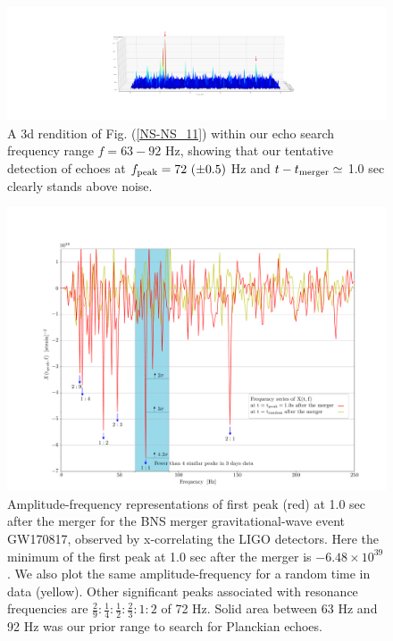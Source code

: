 \documentclass[a4paper,11pt]{article}
\begin{document}
\begin{figure}[!tbp]
    \includegraphics[width=\textwidth]{3d.pdf}
 \caption{A 3d rendition of Fig. (\ref{NS-NS_11}) within our echo search frequency range $f=63-92$ Hz, showing that our tentative detection of echoes at  $f_{\rm{peak}}=72\ (\pm 0.5)$ Hz and $t-t_{\rm{merger}} \simeq $ 1.0 sec clearly stands above noise. }
 \label{NS-NS_3d}
\end{figure}

\begin{figure}[!tbp]
    \includegraphics[width=1\textwidth]{peaks_in_frequency_05_sec.pdf}
 \caption{Amplitude-frequency representations of first peak (red) at 1.0 sec after the merger for the BNS merger gravitational-wave event GW170817, observed by x-correlating the LIGO detectors. Here the minimum of the first peak at 1.0 sec after the merger is $-6.48\times10^{39}$. We also plot the same amplitude-frequency for a random time in data (yellow). Other significant peaks associated with resonance frequencies are $\frac{2}{9}:\frac{1}{4}:\frac{1}{2}:\frac{2}{3}:1:2$ of 72 Hz.  Solid area between 63 Hz and 92 Hz was our prior range to search for Planckian echoes.}
 \label{NS-NS_4}
\end{figure}
\end{document}
